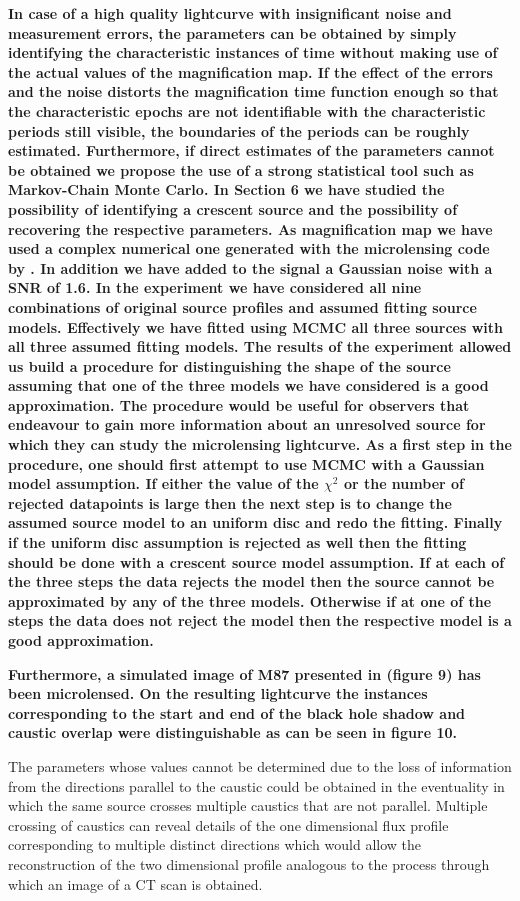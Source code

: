 \textbf{In case of a high quality lightcurve with insignificant noise and measurement errors, the parameters can be obtained 
by simply identifying the characteristic instances of time without making use of the actual values of the magnification
 map. If the effect of the errors and the noise distorts the magnification time function enough so that the 
characteristic epochs are not identifiable with the characteristic periods still visible, the boundaries of the periods 
can be roughly estimated. Furthermore, if direct estimates of the parameters cannot be obtained we propose the use of a strong
statistical tool such as Markov-Chain Monte Carlo. In Section 6  we have studied the possibility of identifying a crescent 
source and  the possibility of recovering the respective parameters. As magnification map we have used a complex numerical 
one generated with the microlensing code by \cite{1999A&A...346L...5W}. In addition we have added to the signal a Gaussian 
noise with a SNR of 1.6.  In the experiment we have considered all nine combinations of original source profiles and assumed fitting source models.
Effectively we have fitted using MCMC all three sources with all three assumed fitting models. The results of the experiment allowed us build a 
procedure for distinguishing the shape of the source assuming that one of the three models we have considered is a good approximation.  
The procedure would be useful for observers that endeavour to gain more information about an unresolved source for which they can study 
the microlensing lightcurve.  As a first step in the procedure, one should first attempt to use MCMC with a Gaussian model assumption. 
If either the value of the $\chi^2$ or the number of rejected datapoints is large then the next step is to change the assumed source model to 
an uniform disc and redo the fitting. Finally if the uniform disc assumption is rejected as well then the fitting should be done with a 
crescent source model assumption. If at each of the three steps the data rejects the model then the source cannot be approximated by any of the three models. 
Otherwise if at one of the steps the data does not reject the model then the respective model is a good approximation.   }

\textbf{Furthermore, a simulated image of M87 presented in \citep{2012MNRAS.421.1517D} (figure 9) has been microlensed. On the resulting lightcurve the instances corresponding to the start and end of the black hole shadow and caustic overlap were distinguishable as can be seen in figure 10.}
    
The parameters whose values cannot be determined due to the loss of information from the directions parallel to the 
caustic could be obtained in the eventuality in which the same source crosses multiple caustics that are not parallel. 
Multiple crossing of caustics can reveal details of the one dimensional flux profile corresponding to multiple distinct 
directions which would allow the reconstruction of the two dimensional profile analogous to the process through which an image of a CT scan is obtained.  

 


